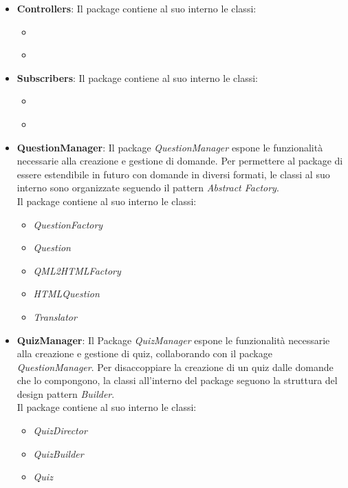 	\begin{itemize}
	\item \textbf{Controllers}:
	Il package contiene al suo interno le classi:
	\begin{itemize}
		\item \textit{}
		\item \textit{}
	\end{itemize}	
	\item \textbf{Subscribers}:
	Il package contiene al suo interno le classi:
	\begin{itemize}
		\item \textit{}
		\item \textit{}
	\end{itemize}
	
	\item \textbf{QuestionManager}:
	Il package \emph{QuestionManager} espone le funzionalità necessarie alla creazione e gestione di domande. Per permettere al package di essere estendibile in futuro con domande in diversi formati, le classi al suo interno sono organizzate seguendo il pattern \emph{Abstract Factory}. \\
	Il package contiene al suo interno le classi:
	\begin{itemize}
		\item \textit{QuestionFactory}
		\item \textit{Question}
		\item \textit{QML2HTMLFactory}
		\item \textit{HTMLQuestion}
		\item \textit{Translator}
	\end{itemize}
	
	\item\textbf{QuizManager}:
	Il Package \emph{QuizManager} espone le funzionalità necessarie alla creazione e gestione di quiz, collaborando con il package \emph{QuestionManager}. Per disaccoppiare la creazione di un quiz dalle domande che lo compongono, la classi all'interno del package seguono la struttura del design pattern \emph{Builder}.\\ 
	Il package contiene al suo interno le classi:
	\begin{itemize}
		\item \textit{QuizDirector}
		\item \textit{QuizBuilder}
		\item \textit{Quiz}
	\end{itemize}
	

\end{itemize}
